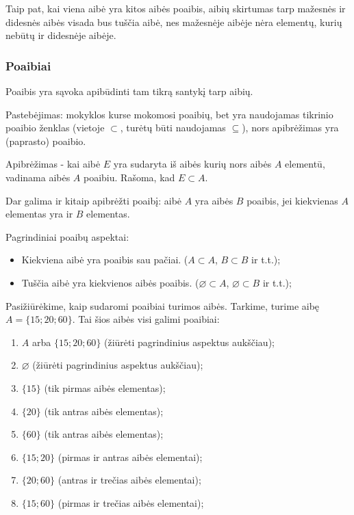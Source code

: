 \documentclass[a4paper]{article}
\begin{document}
Taip pat, kai viena aibė yra kitos aibės poaibis, aibių skirtumas tarp mažesnės
ir didesnės aibės visada bus tuščia aibė, nes mažesnėje aibėje nėra elementų,
kurių nebūtų ir didesnėje aibėje.

\subsubsection{Poaibiai}

Poaibis yra sąvoka apibūdinti tam tikrą santykį tarp aibių.

Pastebėjimas: mokyklos kurse mokomosi poaibių, bet yra naudojamas tikrinio
poaibio ženklas (vietoje $\subset$, turėtų būti naudojamas $\subseteq$), nors
apibrėžimas yra (paprasto) poaibio.

Apibrėžimas - kai aibė $E$ yra sudaryta iš aibės kurių nors aibės $A$ elementū,
vadinama aibės $A$ poaibiu. Rašoma, kad $E \subset A $.

Dar galima ir kitaip apibrėžti poaibį: aibė $A$ yra aibės $B$ poaibis, jei
kiekvienas $A$ elementas yra ir $B$ elementas.

Pagrindiniai poaibų aspektai:

\begin{itemize}
      \item Kiekviena aibė yra poaibis sau pačiai. ($A \subset A$, $B \subset
                  B$ ir t.t.);
      \item Tuščia aibė yra kiekvienos aibės poaibis. ($\varnothing \subset A$,
            $\varnothing \subset B$ ir t.t.);
\end{itemize}

Pasižiūrėkime, kaip sudaromi poaibiai turimos aibės. Tarkime, turime aibę
$A=\{15;20;60\}$. Tai šios aibės visi galimi poaibiai:
\begin{enumerate}
      \item $A$ arba $\{15;20;60\}$ (žiūrėti pagrindinius aspektus aukščiau);
      \item $\varnothing$ (žiūrėti pagrindinius aspektus aukščiau);
      \item $\{15\}$ (tik pirmas aibės elementas);
      \item $\{20\}$ (tik antras aibės elementas);
      \item $\{60\}$ (tik antras aibės elementas);
      \item $\{15;20\}$ (pirmas ir antras aibės elementai);
      \item $\{20;60\}$ (antras ir trečias aibės elementai);
      \item $\{15;60\}$ (pirmas ir trečias aibės elementai);
\end{enumerate}
\end{document}

